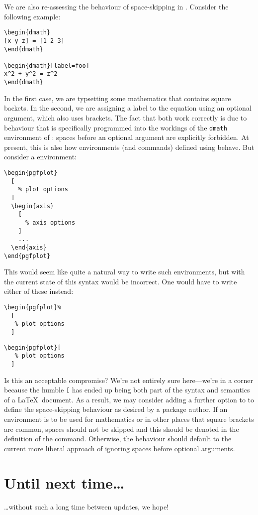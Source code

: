 \documentclass{ltnews}
\begin{document}
We are also re-assessing the behaviour of space-skipping in .
Consider the following example:
\begin{multicols}{2}
\begin{verbatim}
\begin{dmath}
[x y z] = [1 2 3]
\end{dmath}

\begin{dmath}[label=foo]
x^2 + y^2 = z^2
\end{dmath}
\end{verbatim}
\end{multicols}
In the first case, we are typsetting some mathematics that contains square backets.
In the second, we are assigning a label to the equation using an optional argument, which also uses  brackets.
The fact that both work correctly is due to behaviour that is specifically programmed into the workings of the \texttt{dmath} environment of : spaces before an optional argument are explicitly forbidden.
At present, this is also how environments (and commands) defined using  behave.
But consider a  environment:
\begin{verbatim}
\begin{pgfplot}
  [
    % plot options
  ]
  \begin{axis}
    [
      % axis options
    ]
    ...
  \end{axis}
\end{pgfplot}
\end{verbatim}
This would seem like quite a natural way to write such environments, but with the current state of  this syntax would be incorrect. One would have to write either of these instead:
\begin{multicols}{2}
\begin{verbatim}
\begin{pgfplot}%
  [
   % plot options
  ]
\end{verbatim}
\begin{verbatim}
\begin{pgfplot}[
   % plot options
  ]
\end{verbatim}
\end{multicols}
Is this an acceptable compromise?
We're not entirely sure here---we're in a corner because the humble \texttt{[} has ended up being both part of the syntax and semantics of a \LaTeX\ document.
As a result, we may consider adding a further option to  to define the space-skipping behaviour as desired by a package author.
If an environment is to be used for mathematics or in other places that square brackets are common, spaces should not be skipped and this should be denoted in the definition of the command.
Otherwise, the behaviour should default to the current more liberal approach of ignoring spaces before optional arguments.


\section{Until next time\dots}

\dots without such a long time between updates, we hope!
\end{document}
